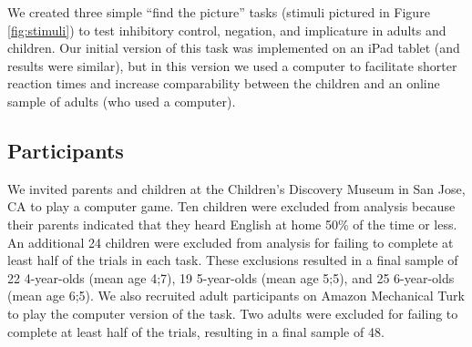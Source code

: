\documentclass[man, noapacite]{apa2}
\newcommand{\aen}[1]{\textcolor{DarkOrange}{[aen: #1]}}
\begin{document}
We created three simple ``find the picture'' tasks (stimuli pictured in Figure \ref{fig:stimuli}) to test inhibitory control, negation, and implicature in adults and children. Our initial version of this task was implemented on an iPad tablet (and results were similar), but in this version we used a computer to facilitate shorter reaction times and increase comparability between the children and an online sample of adults (who used a computer).


\subsection{Participants}

We invited parents and children at the Children's Discovery Museum in San Jose, CA to play a computer game. Ten children were excluded from analysis because their parents indicated that they heard English at home 50\% of the time or less. An additional 24 children were excluded from analysis for failing to complete at least half of the trials in each task. These exclusions resulted in a final sample of 22 4-year-olds (mean age 4;7), 19 5-year-olds (mean age 5;5), and 25 6-year-olds (mean age 6;5). We also recruited adult participants on Amazon Mechanical Turk to play the computer version of the task. Two adults were excluded for failing to complete at least half of the trials, resulting in a final sample of 48.
\end{document}
